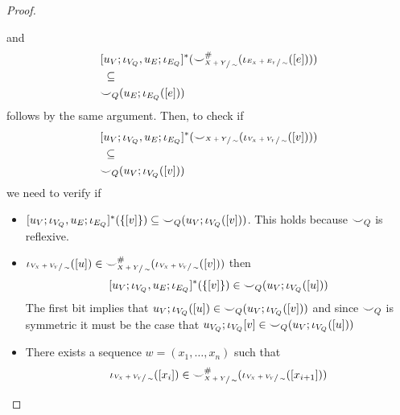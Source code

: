 \begin{proof}
\begin{enumerate}
       and
       \begin{align*}
        &[u_{V};\iota_{V_{Q}}, u_{E};\iota_{E_{Q}}]^{*}({\smile}_{\sfrac{X+Y}{\sim}}^{{\#}}(\iota_{\sfrac{E_{X} + E_{Y}}{\sim}}([e])))\\
        &\;\subseteq\\
        &{\smile}_{Q}(u_{E};\iota_{E_{Q}}([e]))
       \end{align*} follows by the same argument.
       Then, to check if
       \begin{align*}
        &[u_{V};\iota_{V_{Q}}, u_{E};\iota_{E_{Q}}]^{*}({\smile}_{\sfrac{X+Y}{\sim}}(\iota_{\sfrac{V_{X} + V_{Y}}{\sim}}([v])))\\
        &\; \subseteq\\
        &{\smile}_{Q}(u_{V};\iota_{V_{Q}}([v]))
       \end{align*}
       we need to verify if
       \begin{itemize}
        \item $[u_{V};\iota_{V_{Q}},u_{E};\iota_{E_{Q}}]^{*}(\{[v]\}) \subseteq {\smile}_{Q}(u_{V};\iota_{V_{Q}}([v]))$.
              This holds because ${\smile}_{Q}$ is reflexive.
        \item $\iota_{\sfrac{V_{X} + V_{Y}}{\sim}}([u]) \in {\smile}_{\sfrac{X+Y}{\sim}}^{{\#}}(\iota_{\sfrac{V_{X} + V_{Y}}{\sim}}([v]))$ then 
        \[
            [u_{V};\iota_{V_{Q}}, u_{E};\iota_{E_{Q}}]^{*}(\{[v]\}) \in {\smile}_{Q}(u_{V};\iota_{V_{Q}}([u]))
        \]
              The first bit implies that $u_{V};\iota_{V_{Q}}([u]) \in {\smile}_{Q}(u_{V};\iota_{V_{Q}}([v]))$ and since ${\smile}_{Q}$ is symmetric it must be the case that $u_{V_{Q}};\iota_{V_{Q}}[v] \in {\smile}_{Q}(u_{V};\iota_{V_{Q}}([u]))$
        \item There exists a sequence $w = (x_1, \ldots, x_n)$ such that 
        \[
            \iota_{\sfrac{V_{X} + V_{Y}}{\sim}}([x_i]) \in {\smile}_{\sfrac{X+Y}{\sim}}^{{\#}}(\iota_{\sfrac{V_{X} + V_{Y}}{\sim}}([x_{i+1}]))
        \] 
        

\end{itemize}
\end{enumerate}
\end{proof}
